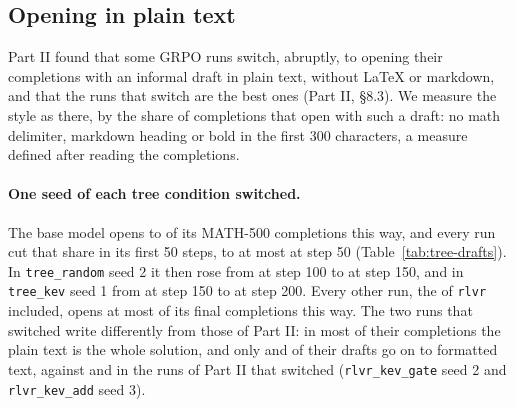 \begin{table}[t]
\centering\small

\caption{Final policies: accuracy in percent, seed mean $\pm$ standard deviation over seeds. MATH-500 and GSM8K: greedy.
AMC23, AIME24 and AIME25: mean over 16 samples per problem at temperature 0.6. \texttt{rlvr}: flat sampling (Part II).}
\label{tab:tree-acc}
\end{table}

\begin{table}[t]
\centering\small

\caption{The final accuracy of each seed, in percent. The third seed of each tree condition was added after the first
two had finished.}
\label{tab:tree-seeds}
\end{table}

\begin{table}[t]
\centering\small

\caption{Paired differences to \texttt{tree\_random} in percentage points: per problem, each condition's seed mean,
averaged over problems, with a 95\% bootstrap interval over problems. \texttt{tree\_kev} minus \texttt{tree\_random}
isolates the judge's choice of roots; \texttt{rlvr} minus \texttt{tree\_random} the tree shape.}
\label{tab:tree-paired}
\end{table}

\subsection{Opening in plain text}\label{sec:res-tree-drafts}

Part II found that some GRPO runs switch, abruptly, to opening their completions with an informal draft in plain text,
without LaTeX or markdown, and that the runs that switch are the best ones (Part II, \S8.3). We measure the style as
there, by the share of completions that open with such a draft: no math delimiter, markdown heading or bold in the
first 300 characters, a measure defined after reading the completions.

\paragraph{One seed of each tree condition switched.} The base model opens  to
 of its MATH-500 completions this way, and every run cut that share in its first 50 steps, to at
most  at step 50 (Table~\ref{tab:tree-drafts}). In \texttt{tree\_random} seed 2 it then rose from
 at step 100 to  at step 150, and in \texttt{tree\_kev} seed 1
from  at step 150 to  at step 200. Every other run, the  of
\texttt{rlvr} included, opens at most  of its final completions this way. The two runs that switched
write differently from those of Part II: in most of their completions the plain text is the whole solution, and only
 and  of their drafts go on to formatted text, against
 and  in the runs of Part II that switched (\texttt{rlvr\_kev\_gate}
seed 2 and \texttt{rlvr\_kev\_add} seed 3).

